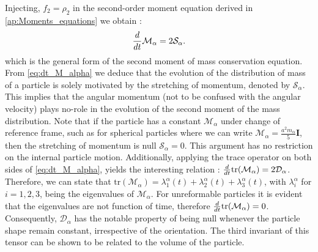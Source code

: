 Injecting, $f_2 = \rho_2$ in the second-order moment equation derived in \ref{ap:Moments_equations} we obtain :
\begin{equation}
    \frac{d}{d t} {\mathcal{M}_\alpha}=2\mathcal{S}_\alpha. 
    \label{eq:dt_M_alpha}
\end{equation}
which is the general form of the second moment of mass conservation equation. 
From \ref{eq:dt_M_alpha} we deduce that the evolution of the distribution of mass of a particle is solely motivated by the stretching of momentum, denoted by $\mathcal{S}_\alpha$. 
This implies that the angular momentum (not to be confused with the angular velocity) plays no-role in the evolution of the second moment of the mass distribution. 
Note that if the particle has a constant $\mathcal{M}_\alpha$ under change of reference frame, such as for spherical particles where we can write $\mathcal{M}_\alpha= \frac{a^2 m_\alpha}{5} \textbf{I}$, then the stretching of momentum is null $\mathcal{S}_\alpha=0$.
This argument has no restriction on the internal particle motion. 
Additionally, applying the trace operator on both sides of \ref{eq:dt_M_alpha}, yields the interesting relation : $\frac{d}{d t} {\text{tr}(\mathcal{M}_\alpha)}=2\mathcal{D}_\alpha$.
Therefore, we can state that $\text{tr}(\mathcal{M}_\alpha) = \lambda^\alpha_1(t)+\lambda^\alpha_2(t)+\lambda^\alpha_3(t)$, with $\lambda_i^\alpha$ for $i=1,2,3$, being the eigenvalues of $\mathcal{M}_\alpha$.
For unreformable particles it is evident that the eigenvalues are not function of time, therefore $\frac{d}{d t}{ \text{tr}(\mathcal{M}_\alpha)}=0$.  
Consequently, $\mathcal{D}_\alpha$ has the notable property of being null whenever the particle shape remain constant, irrespective of the orientation.
The third invariant of this tensor can be shown to be related to the volume of the particle. 

